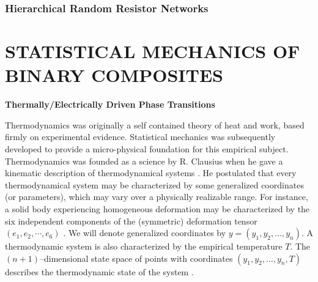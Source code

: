 \documentclass[english,12pt]{ttuthes}
\begin{document}
\subsection{Hierarchical Random Resistor Networks}
\label{subsec:Hierarchial_RRNs}
%
\chapter{STATISTICAL MECHANICS OF BINARY COMPOSITES} 
\label{ch:Stat_Mech_Bin_Comps}
%
%
\noindent
\textbf{Thermally/Electrically Driven Phase Transitions}
%

Thermodynamics was originally a self contained theory of heat and
work, based firmly on experimental evidence. Statistical mechanics was
subsequently developed to provide a micro-physical foundation for this
empirical subject. Thermodynamics was founded as a science by
R. Clausius when he gave a kinematic description of thermodynamical
systems \cite{Berdichevsky-1997}. He postulated that every 
thermodynamical system may be characterized by some generalized
coordinates (or parameters), which may vary over a physically
realizable range. For instance, a solid body experiencing homogeneous
deformation may be characterized by the six independent components of
the (symmetric) deformation tensor $(e_1,e_2,\cdots,e_6)$
\cite{Berdichevsky-1997,Robertson-1993}. We will denote generalized 
coordinates by $y=(y_1,y_2,\ldots,y_n)$. A thermodynamic system is also
characterized by the empirical temperature $T$. The
$(n+1)$--dimensional state space of points with coordinates
$(y_1,y_2,\ldots,y_n,T)$ describes the thermodynamic state of the system
\cite{Berdichevsky-1997}. 
\end{document}
